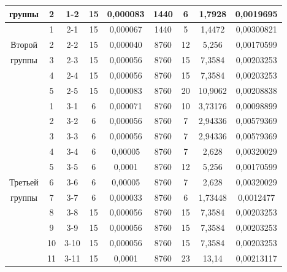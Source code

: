 \begin{table}
\begin{center}
\begin{tabular}{|c|c|c|c|c|c|c|c|c|}
группы&2&1-2&15&0,000083&1440&\hphantom{9}6&1,7928&0,0019695\hphantom{9}\\

\hline

 &1&2-1&15&0,000067&1440&\hphantom{9}5&1,4472&0,00300821\\

Второй&2&2-2&15&0,000040&8760&12&5,256\hphantom{9}&0,00170599\\

группы&3&2-3&15&0,000056&8760&15&7,3584&0,00203253\\

&4&2-4&15&0,000056&8760&15&7,3584&0,00203253\\

&5&2-5&15&0,000083&8760&20&10,9062\hphantom{9}&0,00208838\\

\hline

 &1&3-1&\hphantom{9}6&0,000071&8760&10&\hphantom{9}3,73176&0,00098899\\

&2&3-2&\hphantom{9}6&0,000056&8760&\hphantom{9}7&\hphantom{9}2,94336&0,00579369\\

&3&3-3&\hphantom{9}6&0,000056&8760&\hphantom{9}7&\hphantom{9}2,94336&0,00579369\\

&4&3-4&\hphantom{9}6&0,00005\hphantom{9}&8760&\hphantom{9}7&2,628\hphantom{9}&0,00320029\\

&5&3-5&\hphantom{9}6&0,0001\hphantom{99}&8760&12&5,256\hphantom{9}&0,00170599\\

Третьей&6&3-6&\hphantom{9}6&0,00005\hphantom{9}&8760&\hphantom{9}7&2,628\hphantom{9}&0,00320029\\

группы&7&3-7&\hphantom{9}6&0,000033&8760&\hphantom{9}6&\hphantom{9}1,73448&0,0012477\hphantom{9}\\

&8&3-8&15&0,000056&8760&15&7,3584&0,00203253\\

&9&3-9&15&0,000056&8760&15&7,3584&0,00203253\\

&10\hphantom{9}&\hphantom{9}3-10&15&0,000056&8760&15&7,3584&0,00203253\\

&11\hphantom{9}&\hphantom{9}3-11&15&0,0001\hphantom{99}&8760&23&13,14\hphantom{999}&0,00213117\\


\end{tabular}
\end{center}
\end{table}
